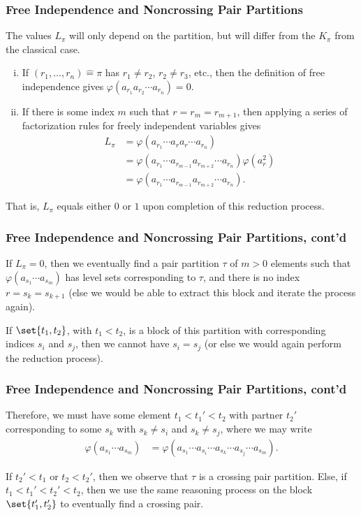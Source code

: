\documentclass{beamer}
\begin{document}
\begin{frame}
  \frametitle{Free Independence and Noncrossing Pair Partitions}
  The values $L_{\pi}$ will only depend on the partition, but will differ from the $K_{\pi}$ from the classical case.
  \begin{enumerate}[(i)]
    \item If $\left( r_1,\dots,r_n \right)\hat{=}\pi$ has $r_1\neq r_2$, $r_2\neq r_3$, etc., then the definition of free independence gives $\varphi\left( a_{r_1}a_{r_2}\cdots a_{r_n} \right) = 0$.\pause
    \item If there is some index $m$ such that $r = r_m = r_{m+1}$, then applying a series of factorization rules for freely independent variables gives
      \begin{align*}
        L_{\pi} &= \varphi\left( a_{r_1}\cdots a_{r}a_{r}\cdots a_{r_n} \right)\\
                &= \varphi\left( a_{r_1}\cdots a_{r_{m-1}}a_{r_{m+2}}\cdots a_{r_n} \right)\varphi\left( a_r^2 \right)\\
                &= \varphi\left( a_{r_1}\cdots a_{r_{m-1}}a_{r_{m+2}}\cdots a_{r_n} \right).
      \end{align*}
  \end{enumerate}
  That is, $L_{\pi}$ equals either $0$ or $1$ upon completion of this reduction process.
\end{frame}
\begin{frame}
  \frametitle{Free Independence and Noncrossing Pair Partitions, cont'd}
  If $L_{\pi} = 0$, then we eventually find a pair partition $\tau$ of $m > 0$ elements such that $\varphi\left( a_{s_1}\cdots a_{s_m} \right)$ has level sets corresponding to $\tau$, and there is no index $r = s_{k} = s_{k+1}$ (else we would be able to extract this block and iterate the process again).\newline\pause

  If $\set{t_1,t_2}$, with $t_1 < t_2$, is a block of this partition with corresponding indices $s_i$ and $s_j$, then we cannot have $s_i = s_j$ (or else we would again perform the reduction process).
\end{frame}
\begin{frame}
  \frametitle{Free Independence and Noncrossing Pair Partitions, cont'd}
  Therefore, we must have some element $t_1 < t_1' < t_2$ with partner $t_2'$ corresponding to some $s_k$ with $s_k\neq s_i$ and $s_k\neq s_j$, where we may write
  \begin{align*}
    \varphi\left( a_{s_1}\cdots a_{s_m} \right) &= \varphi\left( a_{s_1}\cdots a_{s_i}\cdots a_{s_k}\cdots a_{s_j}\cdots a_{s_m} \right).
  \end{align*}\pause

  If $t_2' < t_1$ or $t_2 < t_2'$, then we observe that $\tau$ is a crossing pair partition. Else, if $t_1 < t_1' < t_2' < t_2$, then we use the same reasoning process on the block $\set{t_1',t_2'}$ to eventually find a crossing pair.
\end{frame}
\end{document}
